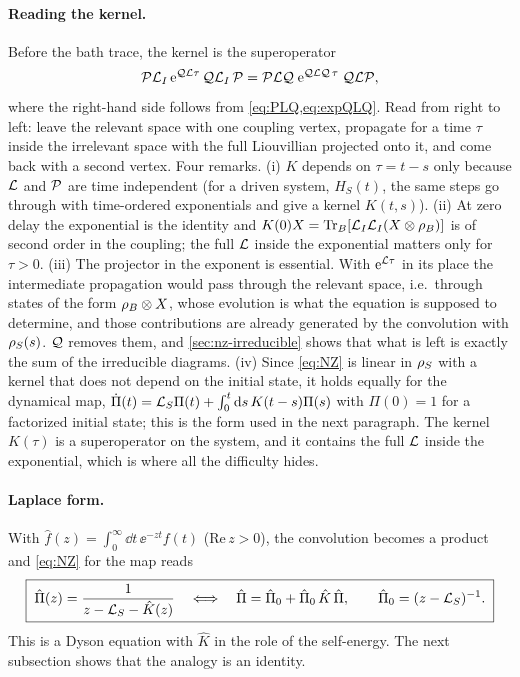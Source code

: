 \paragraph{Reading the kernel.}
Before the bath trace, the kernel is the superoperator
\begin{equation}
  \mathcal{P}\mathcal{L}_I\,\mathrm{e}^{\mathcal{Q}\mathcal{L}\tau}\,\mathcal{Q}\mathcal{L}_I\,\mathcal{P}
  =\mathcal{P}\mathcal{L}\mathcal{Q}\;\mathrm{e}^{\mathcal{Q}\mathcal{L}\mathcal{Q}\,\tau}\;\mathcal{Q}\mathcal{L}\mathcal{P} ,
  \label{eq:K-PLQ}
\end{equation}
where the right-hand side follows from \cref{eq:PLQ,eq:expQLQ}.
Read from right to left: leave the relevant space with one coupling vertex, propagate for a time $\tau$ inside the irrelevant space with the full Liouvillian projected onto it, and come back with a second vertex.
Four remarks.
(i) $K$ depends on $\tau=t-s$ only because $\mathcal{L}$ and $\mathcal{P}$ are time independent (for a driven system, $H_S(t)$, the same steps go through with time-ordered exponentials and give a kernel $K(t,s)$).
(ii) At zero delay the exponential is the identity and $K(0)X=\operatorname{Tr}_B[\mathcal{L}_I\mathcal{L}_I(X\otimes\rho_{B})]$ is of second order in the coupling; the full $\mathcal{L}$ inside the exponential matters only for $\tau>0$.
(iii) The projector in the exponent is essential.
With $\mathrm{e}^{\mathcal{L}\tau}$ in its place the intermediate propagation would pass through the relevant space, i.e.\ through states of the form $\rho_{B}\otimes X$, whose evolution is what the equation is supposed to determine, and those contributions are already generated by the convolution with $\rho_{S}(s)$.
$\mathcal{Q}$ removes them, and \cref{sec:nz-irreducible} shows that what is left is exactly the sum of the irreducible diagrams.
(iv) Since \cref{eq:NZ} is linear in $\rho_{S}$ with a kernel that does not depend on the initial state, it holds equally for the dynamical map, $\dot\Pi(t)=\mathcal{L}_S\Pi(t)+\int_0^t\mathrm{d} s\,K(t-s)\Pi(s)$ with $\Pi(0)=1$ for a factorized initial state; this is the form used in the next paragraph.
The kernel $K(\tau)$ is a superoperator on the system, and it contains the full $\mathcal{L}$ inside the exponential, which is where all the difficulty hides.

\paragraph{Laplace form.}
With $\hat f(z)=\int_0^\infty\dd t\,\ee^{-zt}f(t)$ (Re$\,z>0$), the convolution becomes a product and \cref{eq:NZ} for the map reads
\begin{equation}
  \boxed{\;\hat\Pi(z)=\frac{1}{z-\mathcal{L}_S-\hat K(z)}
  \quad\Longleftrightarrow\quad
  \hat\Pi=\hat\Pi_0+\hat\Pi_0\,\hat K\,\hat\Pi,\qquad \hat\Pi_0=(z-\mathcal{L}_S)^{-1}.\;}
  \label{eq:Dyson}
\end{equation}
This is a Dyson equation with $\hat K$ in the role of the self-energy.
The next subsection shows that the analogy is an identity.

